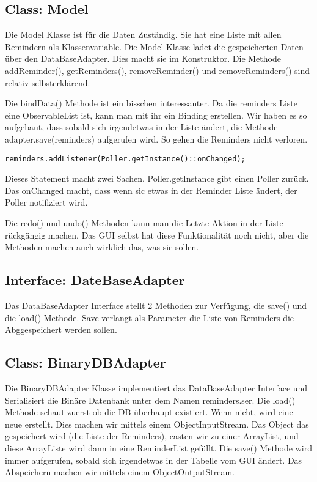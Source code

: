 \subsection{Class: Model}
Die Model Klasse ist für die Daten Zuständig. Sie hat eine Liste mit allen Remindern als Klassenvariable. Die Model Klasse ladet die gespeicherten Daten über den DataBaseAdapter.
Dies macht sie im Konstruktor. Die Methode addReminder(), getReminders(), removeReminder() und removeReminders() sind relativ selbsterklärend.

Die bindData() Methode ist ein bisschen interessanter. Da die reminders Liste eine ObservableList ist, kann man mit ihr ein Binding erstellen. Wir haben es so aufgebaut, dass sobald
sich irgendetwas in der Liste ändert, die Methode adapter.save(reminders) aufgerufen wird. So gehen die Reminders nicht verloren.

\begin{lstlisting}
reminders.addListener(Poller.getInstance()::onChanged);
\end{lstlisting}
Dieses Statement macht zwei Sachen. Poller.getInstance gibt einen Poller zurück. Das onChanged macht, dass wenn sic etwas in der Reminder Liste ändert, der Poller notifiziert wird.

Die redo() und undo() Methoden kann man die Letzte Aktion in der Liste rückgängig machen. Das GUI selbst hat diese Funktionalität noch nicht, aber die Methoden machen auch wirklich das, was sie sollen.


\subsection{Interface: DateBaseAdapter}
Das DataBaseAdapter Interface stellt 2 Methoden zur Verfügung, die save() und die load() Methode. Save verlangt als Parameter die Liste von Reminders die Abggespeichert werden
sollen.

\subsection{Class: BinaryDBAdapter}
Die BinaryDBAdapter Klasse implementiert das DataBaseAdapter Interface und Serialisiert die Binäre Datenbank unter dem Namen reminders.ser. Die load() Methode schaut zuerst ob die DB
überhaupt existiert. Wenn nicht, wird eine neue erstellt. Dies machen wir mittels einem ObjectInputStream. Das Object das gespeichert wird (die Liste der Reminders),
casten wir zu einer ArrayList, und diese ArrayListe wird dann in eine ReminderList gefüllt.
Die save() Methode wird immer aufgerufen, sobald sich irgendetwas in der Tabelle vom GUI ändert. Das Abspeichern machen wir mittels einem ObjectOutputStream.
